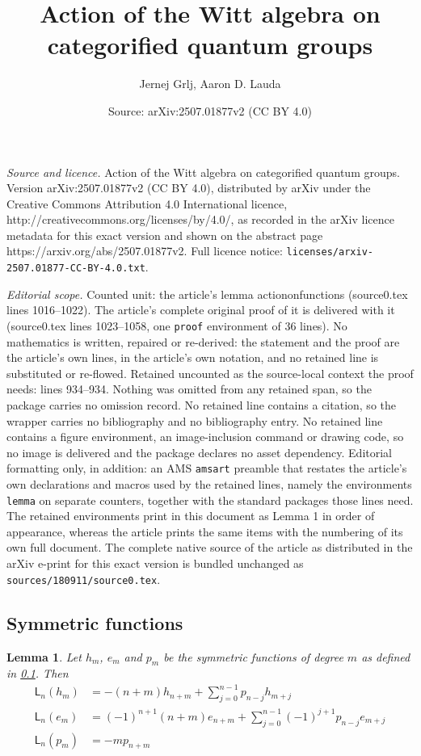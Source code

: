 \documentclass[10pt,a4paper]{amsart}
\title{Action of the Witt algebra on categorified quantum groups}
\author{Jernej Grlj, Aaron D. Lauda}
\date{Source: arXiv:2507.01877v2 (CC BY 4.0)}
\newtheorem{lemma}{Lemma}
\newcommand{\LLn}[1][n]{{\mathsf{L}_{#1}}}
\begin{document}
\maketitle

\noindent\emph{Source and licence.} Action of the Witt algebra on categorified quantum groups. Version arXiv:2507.01877v2 (CC BY 4.0), distributed by arXiv under the Creative Commons Attribution 4.0 International licence, http://creativecommons.org/licenses/by/4.0/, as recorded in the arXiv licence metadata for this exact version and shown on the abstract page https://arxiv.org/abs/2507.01877v2. Full licence notice: \texttt{licenses/arxiv-2507.01877-CC-BY-4.0.txt}.\par\smallskip

\noindent\textit{Editorial scope.} Counted unit: the article's lemma actiononfunctions (source0.tex lines 1016--1022). The article's complete original proof of it is delivered with it (source0.tex lines 1023--1058, one \texttt{proof} environment of 36 lines). No mathematics is written, repaired or re-derived: the statement and the proof are the article's own lines, in the article's own notation, and no retained line is substituted or re-flowed.  Retained uncounted as the source-local context the proof needs: lines 934--934.  Nothing was omitted from any retained span, so the package carries no omission record.  No retained line contains a citation, so the wrapper carries no bibliography and no bibliography entry.  No retained line contains a figure environment, an image-inclusion command or drawing code, so no image is delivered and the package declares no asset dependency.  Editorial formatting only, in addition: an AMS \texttt{amsart} preamble that restates the article's own declarations and macros used by the retained lines, namely the environments \texttt{lemma} on separate counters, together with the standard packages those lines need.  The retained environments print in this document as Lemma 1 in order of appearance, whereas the article prints the same items with the numbering of its own full document.  The complete native source of the article as distributed in the arXiv e-print for this exact version is bundled unchanged as \texttt{sources/180911/source0.tex}.
\subsection{Symmetric functions} \label{subsec_sympoly}

\begin{lemma}\label{actiononfunctions}
    Let $h_m$, $e_m$ and $p_m$ be the symmetric functions of degree $m$ as defined in \ref{subsec_sympoly}. Then \begin{align*}
        \LLn[n](h_m) &=  -(n+m)h_{n+m} +\sum_{j = 0}^{n-1} p_{n - j} h_{m+j} \\
        \LLn[n](e_m) &=  (-1)^{n+1} (n+m)e_{n+m} + \sum_{j = 0}^{n-1} (-1)^{j+1} p_{n - j} e_{m+j}\\
        \LLn[n](p_m) &= - m p_{n + m}  
    \end{align*}
\end{lemma}
\end{document}

